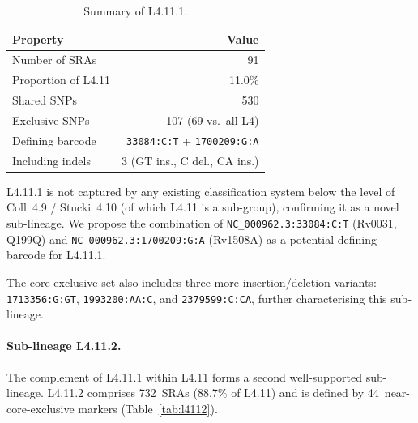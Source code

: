 \documentclass[11pt,a4paper]{article}
\newcommand{\spdi}[1]{\texttt{#1}}
\newcommand{\lignee}[1]{\textsf{#1}}
\begin{document}
\begin{table}[htbp]
	\centering
	\caption{Summary of \lignee{L4.11.1}.}
	\label{tab:l4111}
	\begin{tabular}{lr}
		\toprule
		\textbf{Property}    & \textbf{Value}               \\
		\midrule
		Number of SRAs    & 91                           \\
		Proportion of \lignee{L4.11}  & 11.0\%                       \\
		Shared SNPs           & 530                          \\
		Exclusive SNPs        & 107 (69 vs.\ all L4)         \\
		Defining barcode     & \spdi{33084:C:T} + \spdi{1700209:G:A}  \\
		Including indels     & 3 (GT ins., C del., CA ins.) \\
		\bottomrule
	\end{tabular}
\end{table}

\lignee{L4.11.1} is not captured by any existing classification system below
the level of Coll~4.9 / Stucki~4.10 (of which
\lignee{L4.11} is a sub-group), confirming it as a
novel sub-lineage.  We propose the combination of
\spdi{NC\_000962.3:33084:C:T} (Rv0031, Q199Q) and
\spdi{NC\_000962.3:1700209:G:A} (Rv1508A)
as a potential defining barcode for \lignee{L4.11.1}.

The core-exclusive set also includes three more insertion/deletion variants:
\spdi{1713356:G:GT}, \spdi{1993200:AA:C}, and \spdi{2379599:C:CA},
further characterising this sub-lineage.

\paragraph{Sub-lineage \lignee{L4.11.2}.}

The complement of \lignee{L4.11.1} within \lignee{L4.11} forms a second
well-supported sub-lineage.  \lignee{L4.11.2} comprises 732~SRAs
(88.7\% of \lignee{L4.11}) and is defined by 44~near-core-exclusive markers
(Table~\ref{tab:l4112}).
\end{document}
